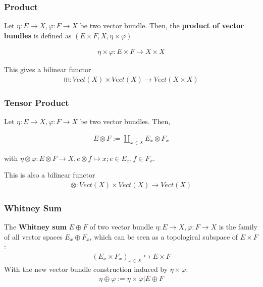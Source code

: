\documentclass[Total.tex]{subfiles}
\begin{document}
	\subsubsection{Product}
	
	\begin{Def}
		Let $\eta:E\rightarrow X,\varphi:F\rightarrow X$ be two vector bundle. Then, the \textbf{product of vector bundles} is defined as $(E\times F,X,\eta\times \varphi)$
		
		\begin{gather*}
			\eta\times \varphi:E\times F\rightarrow X\times X
		\end{gather*}
	\end{Def}
	
	This gives a bilinear functor
	\begin{gather*}
		\boxplus:Vect(X)\times Vect(X)\rightarrow Vect(X\times X) 
	\end{gather*}
	
	
	
	\subsubsection{Tensor Product}
	
	\begin{Def}
		Let $\eta:E\rightarrow X,\varphi:F\rightarrow X$ be two vector bundles. Then,
		
		\begin{gather*}
			E\otimes F:=\coprod_{x\in X} E_x\otimes F_x
		\end{gather*}
		
		with $\eta\otimes \varphi:E\otimes F\rightarrow X,e\otimes f\mapsto x;e\in E_x,f\in F_x$.
	\end{Def}
	This is also a bilinear functor
	\begin{gather*}
		\otimes:Vect(X)\times Vect(X)\rightarrow Vect(X)
	\end{gather*}
	
	\subsubsection{Whitney Sum}
	
	\begin{Def}
		The \textbf{Whitney sum} $E\oplus F$ of two vector bundle $\eta:E\rightarrow X,\varphi:F\rightarrow X$ is the family of all vector spaces $E_x\oplus F_x$, which can be seen as a topological subspace of $E\times F$:
		\begin{gather*}
			(E_x\times F_x)_{x\in X}\hookrightarrow E\times F
		\end{gather*}
		With the new vector bundle construction induced by $\eta\times \varphi$:
		\begin{gather*}
			\eta\oplus \varphi:=\eta\times \varphi|E\oplus F
		\end{gather*}
	\end{Def}
	
\end{document}
